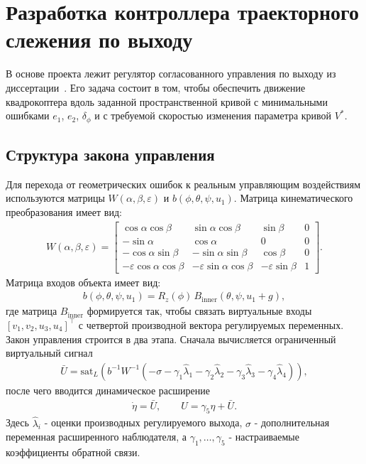\section{Разработка контроллера траекторного слежения по выходу}

В основе проекта лежит регулятор согласованного управления по выходу из диссертации~\cite{kim_algorithms}. 
Его задача состоит в том, чтобы обеспечить движение квадрокоптера вдоль заданной пространственной кривой с минимальными ошибками $e_1$, $e_2$, $\delta_{\phi}$ и с требуемой скоростью изменения параметра кривой $V^{\ast}$.

\subsection{Структура закона управления}

Для перехода от геометрических ошибок к реальным управляющим воздействиям используются матрицы $W(\alpha,\beta,\varepsilon)$ и $b(\phi,\theta,\psi,u_1)$. 
Матрица кинематического преобразования имеет вид:
\begin{gather}
    W(\alpha,\beta,\varepsilon) =
    \begin{bmatrix}
        \cos\alpha \cos\beta & \sin\alpha \cos\beta & \sin\beta & 0 \\
        -\sin\alpha & \cos\alpha & 0 & 0 \\
        -\cos\alpha \sin\beta & -\sin\alpha \sin\beta & \cos\beta & 0 \\
        -\varepsilon \cos\alpha \cos\beta & -\varepsilon \sin\alpha \cos\beta & -\varepsilon \sin\beta & 1
    \end{bmatrix}.
\end{gather}
Матрица входов объекта имеет вид:
\begin{gather}
    b(\phi,\theta,\psi,u_1) = R_z(\phi)\,B_{\mathrm{inner}}(\theta,\psi,u_1 + g),
\end{gather}
где матрица $B_{\mathrm{inner}}$ формируется так, чтобы связать виртуальные входы $[v_1,v_2,u_3,u_4]^{\top}$ с четвертой производной вектора регулируемых переменных.\\
Закон управления строится в два этапа. Сначала вычисляется ограниченный виртуальный сигнал
\begin{gather}
    \bar{U} = \mathrm{sat}_L \left(
        b^{-1} W^{-1}
        \left(
            -\sigma - \gamma_1 \hat{\lambda}_1 - \gamma_2 \hat{\lambda}_2 - \gamma_3 \hat{\lambda}_3 - \gamma_4 \hat{\lambda}_4
        \right)
    \right),
\end{gather}
после чего вводится динамическое расширение
\begin{gather}
    \dot{\eta} = \bar{U}, \qquad U = \gamma_5 \eta + \bar{U}.
\end{gather}
Здесь $\hat{\lambda}_i$ - оценки производных регулируемого выхода, $\sigma$ - дополнительная переменная расширенного наблюдателя, а $\gamma_1,\dots,\gamma_5$ - настраиваемые коэффициенты обратной связи.

